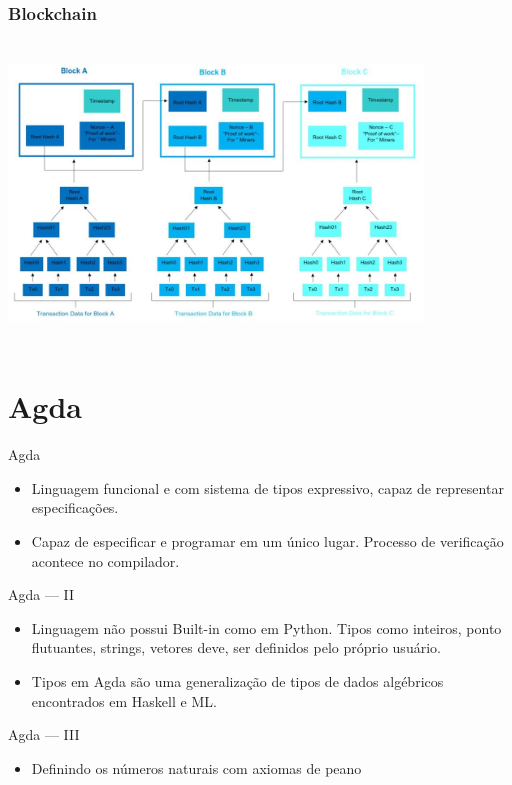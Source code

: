 \documentclass{beamer}
\begin{document}
\begin{frame}
\frametitle{Blockchain}
\includegraphics[width=11cm, height=8cm]{blockchain3}
\end{frame}
 
\section{Agda}

 \begin{frame}{Agda}
 \begin{itemize}
     \item Linguagem funcional e com sistema de tipos expressivo, capaz de representar especificações.
     \item Capaz de especificar e programar em um único lugar. Processo de verificação acontece no compilador.
 \end{itemize}
 \end{frame}
 
 \begin{frame}{Agda --- II}
 \begin{itemize}
     \item Linguagem não possui Built-in como em Python. Tipos como inteiros, ponto flutuantes, strings, vetores deve, ser definidos pelo próprio usuário.
     \item Tipos em Agda são uma generalização de tipos de dados algébricos encontrados em Haskell e ML.
 \end{itemize}
 \end{frame}
 
 \begin{frame}{Agda --- III}
\begin{itemize}
	\item Definindo os números naturais com axiomas de peano
 \end{itemize}
\end{frame}
\end{document}
